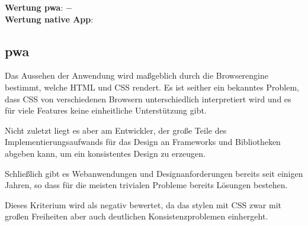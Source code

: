 \textbf{Wertung \ac{pwa}}: $-$\\
\textbf{Wertung native App}:  \\

\subsection{\ac{pwa}}
Das Aussehen der Anwendung wird maßgeblich durch die Browserengine bestimmt, welche HTML und CSS rendert. Es ist seither ein bekanntes Problem, dass CSS von verschiedenen Browsern unterschiedlich interpretiert wird und es für viele Features keine einheitliche Unterstützung gibt.

Nicht zuletzt liegt es aber am Entwickler, der große Teile des Implementierungsaufwands für das Design an Frameworks und Bibliotheken abgeben kann, um ein konsistentes Design zu erzeugen. 

Schließlich gibt es Webanwendungen und Designanforderungen bereits seit einigen Jahren, so dass für die meisten trivialen Probleme bereits Lösungen bestehen.

Dieses Kriterium wird als negativ bewertet, da das stylen mit CSS zwar mit großen Freiheiten aber auch deutlichen Konsistenzproblemen einhergeht.
